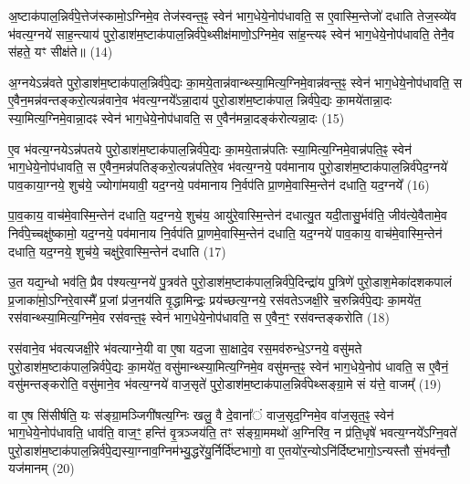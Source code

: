 अ॒ष्टाक॑पाल॒न्निर्व॑पे॒त्तेज॑स्कामो॒\-ऽग्निमे॒व तेज॑स्वन्त॒ꣴ॒ स्वेन॑ भाग॒धेये॒नोप॑धावति॒ स ए॒वास्मि॒न्तेजो॑ दधाति तेज॒स्व्ये॑व भ॑वत्य॒ग्नये॑ साह॒न्त्याय॑ पुरो॒डाश॑म॒ष्टाक॑पाल॒न्निर्व॑पे॒थ्सीक्ष॑माणो॒\-ऽग्निमे॒व सा॑ह॒न्त्यꣴ स्वेन॑ भाग॒धेये॒नोप॑धावति॒ तेनै॒व स॑हते॒ यꣳ सीक्ष॑ते॥ (14)

{\anuvakamend[{भ्रातृ॑व्यस्यास्मि॒न्तेज॑स्वते पुरो॒डाश॑म॒ष्टात्रिꣳ॑शच्च॥३॥}]}

अ॒ग्नये\-ऽन्न॑वते पुरो॒डाश॑म॒ष्टाक॑पाल॒न्निर्व॑पे॒द्यः का॒मये॒तान्न॑वान्थ्स्या॒मित्य॒ग्निमे॒वान्न॑वन्त॒ꣴ॒ स्वेन॑ भाग॒धेये॒नोप॑धावति॒ स ए॒वैन॒मन्न॑वन्तङ्करो॒त्यन्न॑वाने॒व भ॑वत्य॒ग्नये᳚\-ऽन्ना॒दाय॑ पुरो॒डाश॑म॒ष्टाक॑पाल॒ न्निर्व॑पे॒द्यः का॒मये॑तान्ना॒दः स्या॒मित्य॒ग्निमे॒वान्ना॒दꣴ स्वेन॑ भाग॒धेये॒नोप॑धावति॒ स ए॒वैन॑मन्ना॒दङ्क॑रोत्यन्ना॒दः (15)

ए॒व भ॑वत्य॒ग्नये\-ऽन्न॑पतये पुरो॒डाश॑म॒ष्टाक॑पाल॒न्निर्व॑पे॒द्यः का॒मये॒तान्न॑पतिः स्या॒मित्य॒ग्निमे॒वान्न॑पति॒ꣴ॒ स्वेन॑ भाग॒धेये॒नोप॑धावति॒ स ए॒वैन॒मन्न॑पतिङ्करो॒त्यन्न॑पतिरे॒व भ॑वत्य॒ग्नये॒ पव॑मानाय पुरो॒डाश॑म॒ष्टाक॑पाल॒न्निर्व॑पेद॒ग्नये॑ पाव॒काया॒ग्नये॒ शुच॑ये॒ ज्योगा॑मयावी॒ यद॒ग्नये॒ पव॑मानाय नि॒र्वप॑ति प्रा॒णमे॒वास्मि॒न्तेन॑ दधाति॒ यद॒ग्नये᳚ (16)

पा॒व॒काय॒ वाच॑मे॒वास्मि॒न्तेन॑ दधाति॒ यद॒ग्नये॒ शुच॑य॒ आयु॑रे॒वास्मि॒न्तेन॑ दधात्यु॒त यदी॒तासु॒र्भव॑ति॒ जीव॑त्ये॒वैतामे॒व निर्व॑पे॒च्चक्षु॑ष्कामो॒ यद॒ग्नये॒ पव॑मानाय नि॒र्वप॑ति प्रा॒णमे॒वास्मि॒न्तेन॑ दधाति॒ यद॒ग्नये॑ पाव॒काय॒ वाच॑मे॒वास्मि॒न्तेन॑ दधाति॒ यद॒ग्नये॒ शुच॑ये॒ चक्षु॑रे॒वास्मि॒न्तेन॑ दधाति (17)

उ॒त यद्य॒न्धो भव॑ति॒ प्रैव प॑श्यत्य॒ग्नये॑ पु॒त्रव॑ते पुरो॒डाश॑म॒ष्टाक॑पाल॒न्निर्व॑पे॒दिन्द्रा॑य पु॒त्रिणे॑ पुरो॒डाश॒मेका॑दशकपालं प्र॒जाका॑मो़॒\-ऽग्निरे॒वास्मै᳚ प्र॒जां प्र॑ज॒नय॑ति वृ॒द्धामिन्द्रः॒ प्रय॑च्छत्य॒ग्नये॒ रस॑वते\-ऽजक्षी॒रे च॒रुन्निर्व॑पे॒द्यः का॒मये॑त॒ रस॑वान्थ्स्या॒मित्य॒ग्निमे॒व रस॑वन्त॒ꣴ॒ स्वेन॑ भाग॒धेये॒नोप॑धावति॒ स ए॒वैन॒ꣳ॒ रस॑वन्तङ्करोति (18)

रस॑वाने॒व भ॑वत्यजक्षी॒रे भ॑वत्याग्ने॒यी वा ए॒षा यद॒जा सा॒क्षादे॒व रस॒मव॑रुन्धे॒\-ऽग्नये॒ वसु॑मते पुरो॒डाश॑म॒ष्टाक॑पाल॒न्निर्व॑पे॒द्यः का॒मये॑त॒ वसु॑मान्थ्स्या॒मित्य॒ग्निमे॒व वसु॑मन्त॒ꣴ॒ स्वेन॑ भाग॒धेये॒नोप॑ धावति॒ स ए॒वैनं॒ वसु॑मन्तङ्करोति॒ वसु॑माने॒व भ॑वत्य॒ग्नये॑ वाज॒सृते॑ पुरो॒डाश॑म॒ष्टाक॑पाल॒न्निर्व॑पेथ्सङ्ग्रा॒मे सं य॑त्ते॒ वाजम्᳚ (19)

वा ए॒ष सि॑सीर्\mbox{}षति॒ यः स॑ङ्ग्रा॒मञ्जिगी॑षत्य॒ग्निः खलु॒ वै दे॒वाना᳚ं वाज॒सृद॒ग्निमे॒व वा॑ज॒सृत॒ꣴ॒ स्वेन॑ भाग॒धेये॒नोप॑धावति॒ धाव॑ति॒ वाज॒ꣳ॒ हन्ति॑ वृ॒त्रञ्जय॑ति॒ तꣳ स॑ङ्ग्रा॒ममथो॑ अ॒ग्निरि॑व॒ न प्र॑ति॒धृषे॑ भवत्य॒ग्नये᳚\-ऽग्नि॒वते॑ पुरो॒डाश॑म॒ष्टाक॑पाल॒न्निर्व॑पे॒द्यस्या॒ग्नाव॒ग्निम॑भ्यु॒द्धरे॑यु॒र्निर्दि॑ष्टभागो॒ वा ए॒तयो॑र॒न्यो\-ऽनि॑र्दिष्टभागो॒\-ऽन्यस्तौ सं॒भव॑न्तौ॒ यज॑मानम् (20)

